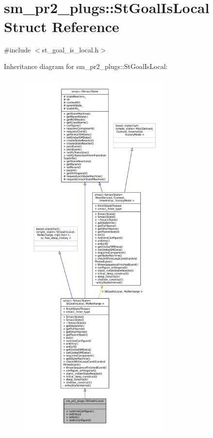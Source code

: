 \hypertarget{structsm__pr2__plugs_1_1StGoalIsLocal}{}\section{sm\+\_\+pr2\+\_\+plugs\+:\+:St\+Goal\+Is\+Local Struct Reference}
\label{structsm__pr2__plugs_1_1StGoalIsLocal}


{\ttfamily \#include $<$st\+\_\+goal\+\_\+is\+\_\+local.\+h$>$}



Inheritance diagram for sm\+\_\+pr2\+\_\+plugs\+:\+:St\+Goal\+Is\+Local\+:
\nopagebreak
\begin{figure}[H]
\begin{center}
\leavevmode
\includegraphics[height=550pt]{structsm__pr2__plugs_1_1StGoalIsLocal__inherit__graph}
\end{center}
\end{figure}


